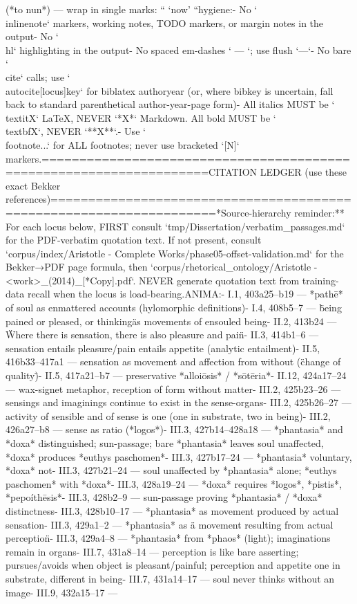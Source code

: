 {(*to nun*) — wrap in single marks: `` `now' ``\n\nLaTeX hygiene:\n- No `\\inlinenote{}` markers, working notes, TODO markers, or margin notes in the output\n- No `\\hl{}` highlighting in the output\n- No spaced em-dashes ` --- `; use flush `---`\n- No bare `\\cite{}` calls; use `\\autocite[locus]{key}` for biblatex authoryear (or, where bibkey is uncertain, fall back to standard parenthetical author-year-page form)\n- All italics MUST be `\\textit{X}` LaTeX, NEVER `*X*` Markdown. All bold MUST be `\\textbf{X}`, NEVER `**X**`.\n- Use `\\footnote{...}` for ALL footnotes; never use bracketed `[N]` markers.\n\n====================================================================\nBEKKER CITATION LEDGER (use these exact Bekker references)\n====================================================================\n\n**Source-hierarchy reminder:** For each locus below, FIRST consult `tmp/Dissertation/verbatim_passages.md` for the PDF-verbatim quotation text. If not present, consult `corpus/index/Aristotle - Complete Works/phase05-offset-validation.md` for the Bekker→PDF page formula, then `corpus/rhetorical_ontology/Aristotle - <work>_(2014)_[*Copy].pdf`. NEVER generate quotation text from training-data recall when the locus is load-bearing.\n\nDE ANIMA:\n- I.1, 403a25–b19 — *pathē* of soul as enmattered accounts (hylomorphic definitions)\n- I.4, 408b5–7 — \"being pained or pleased, or thinking\" as movements of ensouled being\n- II.2, 413b24 — \"Where there is sensation, there is also pleasure and pain\"\n- II.3, 414b1–6 — sensation entails pleasure/pain entails appetite (analytic entailment)\n- II.5, 416b33–417a1 — sensation as movement and affection from without (\"change of quality\")\n- II.5, 417a21–b7 — preservative *alloiōsis* / *sōtēria*\n- II.12, 424a17–24 — wax-signet metaphor, reception of form without matter\n- III.2, 425b23–26 — sensings and imaginings continue to exist in the sense-organs\n- III.2, 425b26–27 — activity of sensible and of sense is one (one in substrate, two in being)\n- III.2, 426a27–b8 — sense as ratio (*logos*)\n- III.3, 427b14–428a18 — *phantasia* and *doxa* distinguished; sun-passage; bare *phantasia* leaves soul unaffected, *doxa* produces *euthys paschomen*\n- III.3, 427b17–24 — *phantasia* voluntary, *doxa* not\n- III.3, 427b21–24 — soul unaffected by *phantasia* alone; *euthys paschomen* with *doxa*\n- III.3, 428a19–24 — *doxa* requires *logos*, *pistis*, *pepoíthēsis*\n- III.3, 428b2–9 — sun-passage proving *phantasia* / *doxa* distinctness\n- III.3, 428b10–17 — *phantasia* as movement produced by actual sensation\n- III.3, 429a1–2 — *phantasia* as \"a movement resulting from actual perception\"\n- III.3, 429a4–8 — *phantasia* from *phaos* (light); imaginations remain in organs\n- III.7, 431a8–14 — perception is like bare asserting; pursues/avoids when object is pleasant/painful; perception and appetite one in substrate, different in being\n- III.7, 431a14–17 — soul never thinks without an image\n- III.9, 432a15–17 — }
